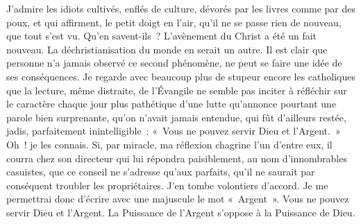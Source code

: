 \documentclass[french,twoside]{book} %
\begin{document}
\noindent J’admire les idiots cultivés, enflés de culture, dévorés par les livres comme par des poux, et qui affirment, le petit doigt en l’air, qu’il ne se passe rien de nouveau, que tout s’est vu. Qu’en savent-ils ? L’avènement du Christ a été un fait nouveau. La déchristianisation du monde en serait un autre. Il est clair que personne n’a jamais observé ce second phénomène, ne peut se faire une idée de ses conséquences. Je regarde avec beaucoup plus de stupeur encore les catholiques que la lecture, même distraite, de l’Évangile ne semble pas inciter à réfléchir sur le caractère chaque jour plus pathétique d’une lutte qu’annonce pourtant une parole bien surprenante, qu’on n’avait jamais entendue, qui fût d’ailleurs restée, jadis, parfaitement inintelligible : « Vous ne pouvez servir Dieu et l’Argent. » Oh ! je les connais. Si, par miracle, ma réflexion chagrine l’un d’entre eux, il courra chez son directeur qui lui répondra paisiblement, au nom d’innombrables casuistes, que ce conseil ne s’adresse qu’aux parfaits, qu’il ne saurait par conséquent troubler les propriétaires. J’en tombe volontiers d’accord. Je me permettrai donc d’écrire avec une majuscule le mot « Argent ». Vous ne pouvez servir Dieu et l’Argent. La Puissance de l’Argent s’oppose à la Puissance de Dieu.\par
\end{document}
